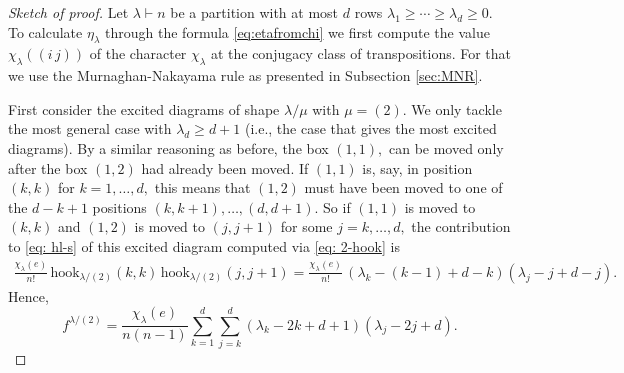 \documentclass[12pt,dvipsnames,accepted=2016-08-18,a4paper,onecolumn]{quantumarticle}
\numberwithin{equation}{section}
\theoremstyle{definition}
\begin{document}
\begin{proof}[Sketch of proof] Let $\lambda \vdash n$ be a partition with at most $d$ rows $\lambda_1\ge\cdots\ge \lambda_d \geq 0.$
To calculate $\eta_\lambda$ through the formula \eqref{eq:etafromchi} we first compute the value $\chi_\lambda((i\,j))$ of the character $\chi_\lambda$ at the conjugacy class of transpositions. 
For that we use the Murnaghan-Nakayama rule as presented in Subsection \ref{sec:MNR}. 

First  consider the excited diagrams of shape $\lambda / \mu$ with $\mu = (2).$ We only tackle the most general case with $\lambda_d \geq d+1$ (i.e., the case that gives the most excited diagrams).  By a similar reasoning as before, the box $(1,1),$ can be moved only after the box $(1,2)$ had already been moved. If $(1,1)$ is, say, in position $(k,k)$ for $k=1,\ldots,d,$ this means that $(1,2)$ must have been moved to one of the $d-k+1$ positions $(k,k+1),\ldots,(d,d+1).$ So if $(1,1)$ is moved to $(k,k)$ and $(1,2)$ is moved to $(j,j+1)$ for some $j=k,\ldots,d,$ the contribution to \eqref{eq: hl-s} of this excited diagram computed via \eqref{eq: 2-hook} is 
\begin{align*}
	\frac{\chi_\lambda(e)}{n!} \, \text{hook}_{\lambda / (2)}(k,k)\,\text{hook}_{\lambda / (2)}(j,j+1) = \frac{\chi_\lambda(e)}{n!} \, (\lambda_k-(k-1)+d-k)(\lambda_j-j+d-j).
\end{align*}
Hence, 
$$
f^{\lambda/(2)} = \frac{\chi_\lambda(e)}{n(n-1)}  \sum_{k=1}^d \sum_{j=k}^d (\lambda_k-2k+d+1)(\lambda_j-2j+d).
$$



\end{proof}
\end{document}
